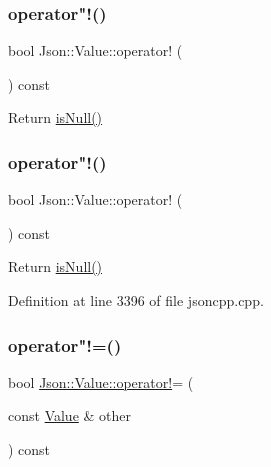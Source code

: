 \subsubsection{\texorpdfstring{operator"!()}{operator!()}\hspace{0.1cm}{\footnotesize\ttfamily [1/2]}}
{\footnotesize\ttfamily bool Json\+::\+Value\+::operator! (\begin{DoxyParamCaption}{ }\end{DoxyParamCaption}) const}



Return \hyperlink{class_json_1_1_value_abde4070e21e46dc4f8203f66582cb19f}{is\+Null()} 

\hypertarget{class_json_1_1_value_a731b89fb4764c39ce2328e1707c822b9}{}\label{class_json_1_1_value_a731b89fb4764c39ce2328e1707c822b9} 
\subsubsection{\texorpdfstring{operator"!()}{operator!()}\hspace{0.1cm}{\footnotesize\ttfamily [2/2]}}
{\footnotesize\ttfamily bool Json\+::\+Value\+::operator! (\begin{DoxyParamCaption}{ }\end{DoxyParamCaption}) const}



Return \hyperlink{class_json_1_1_value_abde4070e21e46dc4f8203f66582cb19f}{is\+Null()} 



Definition at line 3396 of file jsoncpp.\+cpp.

\hypertarget{class_json_1_1_value_a86e95be072e515c48abc61dec63a1689}{}\label{class_json_1_1_value_a86e95be072e515c48abc61dec63a1689} 
\subsubsection{\texorpdfstring{operator"!=()}{operator!=()}\hspace{0.1cm}{\footnotesize\ttfamily [1/2]}}
{\footnotesize\ttfamily bool \hyperlink{class_json_1_1_value_a731b89fb4764c39ce2328e1707c822b9}{Json\+::\+Value\+::operator!}= (\begin{DoxyParamCaption}\item[{const \hyperlink{class_json_1_1_value}{Value} \&}]{other }\end{DoxyParamCaption}) const}


